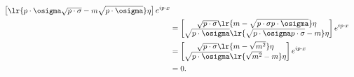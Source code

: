 {\begin{equation}
\begin{aligned}
\begin{bmatrix}
\lr{ p \cdot \osigma \sqrt{ p \cdot \sigma } -m \sqrt{ p \cdot \osigma } } \eta \\
\end{bmatrix}
e^{i p \cdot x}
\\&=
\begin{bmatrix}
\sqrt{ p \cdot \sigma} \lr{ m - \sqrt{ p \cdot \sigma  p \cdot \osigma } } \eta \\
\sqrt{ p \cdot \osigma} \lr{ \sqrt{ p \cdot \osigma p \cdot \sigma } -m } \eta \\
\end{bmatrix}
e^{i p \cdot x}
\\&=
\begin{bmatrix}
\sqrt{ p \cdot \sigma} \lr{ m - \sqrt{ m^2 } } \eta \\
\sqrt{ p \cdot \osigma} \lr{ \sqrt{ m^2 } -m } \eta \\
\end{bmatrix}
e^{i p \cdot x}
\\&=
0.
\end{aligned}
\end{equation}
} %


